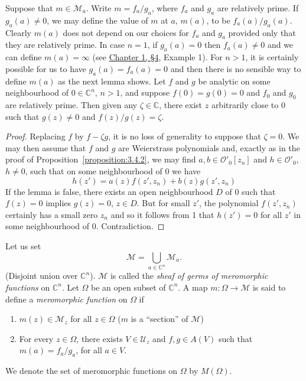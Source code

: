 Suppose that $m\in\mathcal M_a$. Write $m=f_a/g_a$, where $f_a$ and $g_a$ are relatively prime. If $g_a(a)\ne0$, we may define the value of $m$ at $a$, $m(a)$, to be $f_a(a)/g_a(a)$. Clearly $m(a)$ does not depend on our choices for $f_a$ and $g_a$ provided only that they are relatively prime. In case $n=1$, if $g_a(a)=0$ then $f_a(a)\ne0$ and we can define $m(a)=\infty$ (see
\hyperref[sec:1:4]{Chapter 1, \S4}, Example 1). For $n>1$, it is certainly possible for us to have $g_a(a)=f_a(a)=0$ and then there is no sensible way to define $m(a)$ as the next lemma shows.
 Let $f$ and $g$ be analytic on some neighbourhood of $0\in\mathbb C^n$, $n>1$, and suppose $f(0)=g(0)=0$ and $f_0$ and $g_0$ are relatively prime. Then given any $\zeta\in\mathbb C$, there exist $z$ arbitrarily close to $0$ such that $g(z)\ne0$ and $f(z)/g(z)=\zeta$.
\begin{proof}
Replacing $f$ by $f-\zeta g$, it is no loss of generality to suppose that $\zeta=0$. We may then assume that $f$ and $g$ are Weierstrass polynomials and, exactly as in the proof of Proposition~\ref{proposition:3.4.2}, we may find $a,b\in\mathcal O'_0[z_n]$ and $h\in\mathcal O'_0$, $h\ne0$, such that on some neighbourhood of $0$ we have
\begin{equation}h(z')=a(z)f(z',z_n)+b(z)g(z',z_n)\tag{1}\label{eq:3:1:2}\end{equation}
If the lemma is false, there exists an open neighbourhood $D$ of $0$ such that $f(z)=0$ implies $g(z)=0$, $z\in D$. But for small $z'$, the polynomial $f(z',z_n)$ certainly has a small zero $z_n$ and so it follows from 1 that $h(z')=0$ for all $z'$ in some neighbourhood of $0$. Contradiction.
\end{proof}
Let us set
\[\mathcal M=\bigcup_{a\in\mathbb C^n}\mathcal M_a.\]
(Disjoint union over $\mathbb C^n$). $\mathcal M$ is called the \emph{sheaf of germs of meromorphic functions} on $\mathbb C^n$.
 Let $\Omega$ be an open subset of $\mathbb C^n$. A map $m:\Omega\to\mathcal M$ is said to define a \emph{meromorphic function} on $\Omega$ if
\begin{enumerate}
\item $m(z)\in\mathcal M_z$ for all $z\in\Omega$ ($m$ is a ``section'' of $\mathcal M$)
\item For every $z\in\Omega$, there exists $V\in\mathcal U_z$ and $f,g\in A(V)$ such that $m(a)=f_a/g_a$, for all $a\in V$.
\end{enumerate}
We denote the set of meromorphic functions on $\Omega$ by $M(\Omega)$.
